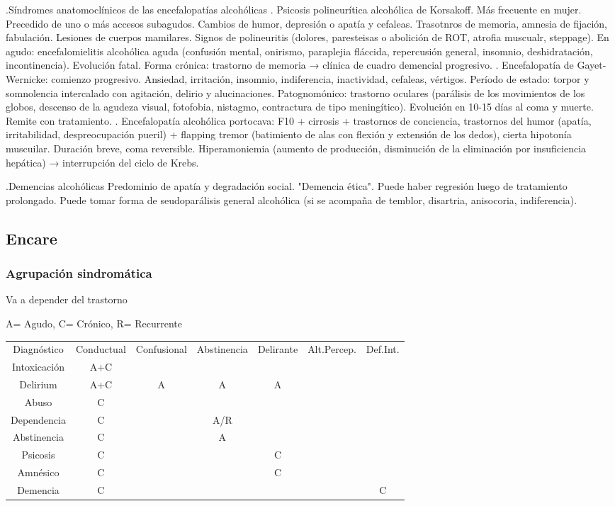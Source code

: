 \documentclass[encares.tex]{subfiles}
\begin{document}
.Síndromes anatomoclínicos de las encefalopatías alcohólicas
. Psicosis polineurítica alcohólica de Korsakoff. Más frecuente en mujer. Precedido de uno o más accesos subagudos. Cambios de humor, depresión o apatía y cefaleas. Trasotnros de memoria, amnesia de fijación, fabulación. Lesiones de cuerpos mamilares. Signos de polineuritis (dolores, paresteisas o abolición de ROT, atrofia muscualr, steppage). En agudo: encefalomielitis alcohólica aguda (confusión mental, onirismo, paraplejia fláccida, repercusión general, insomnio, deshidratación, incontinencia). Evolución fatal. Forma crónica: trastorno de memoria → clínica de cuadro demencial progresivo.
. Encefalopatía de Gayet-Wernicke: comienzo progresivo. Ansiedad, irritación, insomnio, indiferencia, inactividad, cefaleas, vértigos. Período de estado: torpor y somnolencia intercalado con agitación, delirio y alucinaciones. Patognomónico: trastorno oculares (parálisis de los movimientos de los globos, descenso de la agudeza visual, fotofobia, nistagmo, contractura de tipo meningítico). Evolución en 10-15 días al coma y muerte. Remite con tratamiento.
. Encefalopatía alcohólica portocava: F10 + cirrosis + trastornos de conciencia, trastornos del humor (apatía, irritabilidad, despreocupación pueril) + flapping tremor (batimiento de alas con flexión y extensión de los dedos), cierta hipotonía muscuilar. Duración breve, coma reversible. Hiperamoniemia (aumento de producción, disminución de la eliminación por insuficiencia hepática) → interrupción del ciclo de Krebs.

.Demencias alcohólicas
Predominio de apatía y degradación social. "Demencia ética". Puede haber regresión luego de tratamiento prolongado. Puede tomar forma de seudoparálisis general alcohólica (si se acompaña de temblor, disartria, anisocoria, indiferencia).
\subsection*{Encare}
\subsubsection*{Agrupación sindromática}
Va a depender del trastorno

A= Agudo, C= Crónico, R= Recurrente
\begin{center}
\begin{tabular}{|c|c|c|c|c|c|c|}
\hline
Diagnóstico & Conductual & Confusional & Abstinencia & Delirante & Alt.Percep. & Def.Int.\\
Intoxicación & A+C &  & & &\\
Delirium & A+C & A & A & A\\
Abuso & C & & & &\\
Dependencia & C &  & A/R & & \\
Abstinencia & C & & A\\
Psicosis & C & & & C\\
Amnésico & C & & & C\\
Demencia & C & & & & & C\\
\hline
\end{tabular}
\end{center}
\end{document}
